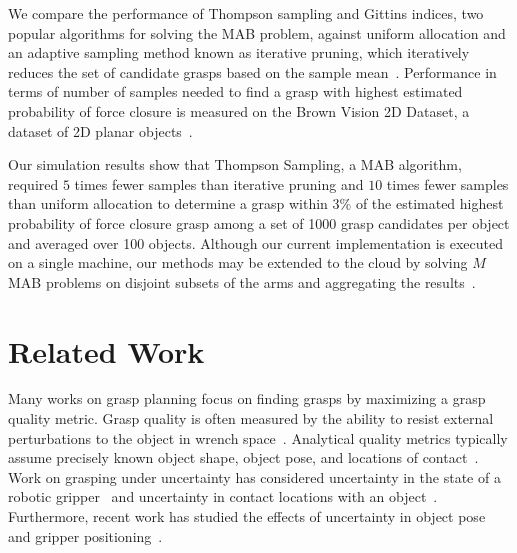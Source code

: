 \documentclass[10pt, conference]{ieeeconf}      %
\begin{document}
We compare the performance of Thompson sampling and Gittins indices, two popular algorithms for solving the MAB problem,
against uniform allocation and an adaptive sampling method known as iterative pruning, which iteratively reduces the set
of candidate grasps based on the sample mean~\cite{kehoe2012toward}. 
Performance in terms of number of samples needed to find a grasp with highest estimated probability of force closure is measured on the Brown Vision 2D Dataset, a dataset of 2D planar objects~\cite{brown, christopoulos2007handling}.

Our simulation results show that Thompson Sampling, a MAB algorithm, required $5$ times fewer samples than iterative
pruning and $10$ times fewer samples than uniform allocation to determine a grasp within $3\%$ of the estimated highest probability of force closure
grasp among a set of 1000 grasp candidates per object and averaged over 100 objects.
Although our current implementation is executed on a single machine, our methods may be extended to the cloud by solving $M$ MAB problems on disjoint subsets of the arms and aggregating the results~\cite{glazebrook2000index}.


\section{Related Work}

Many works on grasp planning focus on finding grasps by maximizing a grasp quality metric. Grasp quality is often measured by the ability to resist external perturbations to the object in wrench space~\cite{ferrari1992, miller2004graspit}. Analytical quality metrics typically assume precisely known object shape, object pose, and locations of contact~\cite{cheong2011output, ciocarlie2009}. Work on grasping under uncertainty has considered uncertainty in the state of a robotic gripper~\cite{goldberg1990bayesian, stulp2011learning} and uncertainty in contact locations with an object~\cite{zheng2005}. Furthermore, recent work has studied the effects of uncertainty in object pose and gripper positioning~\cite{brook2011collaborative, hsiao2011bayesian}.
\end{document}
